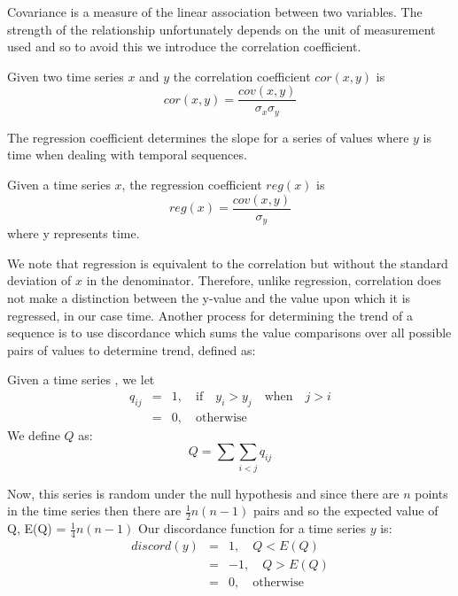 Covariance is a measure of the linear association between two variables.
The strength of the relationship unfortunately depends on the unit of
measurement used and so to avoid this we introduce the correlation
coefficient.

\begin{definition}\label{def:correl}
\begin{rm}
Given two time series $x$ and $y$ the correlation coefficient
$cor(x,y)$ is
\[
cor(x,y) = \frac{cov(x,y)}{\sigma_x \sigma_y}
\]
\end{rm}
\end{definition}

The regression coefficient determines the slope for a series of values
where $y$ is time when dealing with temporal sequences.

\begin{definition}\label{def:regcoef}
\begin{rm}
Given a time series $x$, the regression coefficient
$reg(x)$ is
\[
reg(x) = \frac{cov(x,y)}{\sigma_y}
\]
where y represents time.
\end{rm}
\end{definition}

We note that regression is equivalent to the correlation but without
the standard deviation of $x$ in the denominator. Therefore, unlike
regression, 
correlation does not make a distinction between the y-value and the
value upon which it is regressed, in our case time. Another process
for determining the trend of a sequence is to use discordance which
sums the value comparisons over all possible pairs of values to
determine trend, defined as: 
 

\begin{definition}\label{def:disccoef}
\begin{rm}
Given a time series , we let
\begin{eqnarray*}
q_{ij} & = & 1, \quad\mbox{if}\quad y_i > y_j \quad\mbox{when}\quad j > i \\
       & = & 0, \quad\mbox{otherwise}
\end{eqnarray*}
We define $Q$ as:
\[
Q = \sum \sum_{\!\!\!\!\!\!\!\!\!\!\!i < j} q_{ij}
\]

Now, this series is random under the null hypothesis and since there
are $n$ points in the time series then there are $\frac{1}{2} n(n-1)$
pairs and so the expected value of Q, E(Q) = $\frac{1}{4} n(n-1)$
Our discordance function for a time series $y$ is:
\begin{eqnarray*}
discord(y) & = & 1,  \quad Q < E(Q) \\
      	   & = & -1, \quad Q > E(Q) \\
	   & = & 0,  \quad \mbox{otherwise} 
\end{eqnarray*}
\end{rm}
\end{definition}

